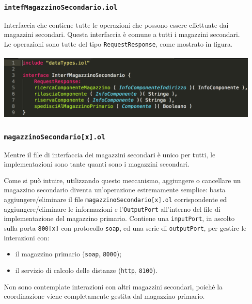 \subsubsection*{\tt intefMagazzinoSecondario.iol}
Interfaccia che contiene tutte le operazioni che possono essere
effettuate dai magazzini secondari. Questa interfaccia \`e comune a
tutti i magazzini secondari. Le operazioni sono tutte del tipo
{\tt RequestResponse}, come mostrato in figura. \\\\
\includegraphics[scale=0.5]{immagini/interfMagazzinoSecondario.png}

\subsubsection*{\tt magazzinoSecondario[x].ol}
Mentre il file di interfaccia dei magazzini secondari \`e unico per
tutti, le implementazioni sono tante quanti sono i magazzini secondari.

Come si pu\`o intuire, utilizzando questo meccanismo, aggiungere o
cancellare un magazzino secondario diventa un'operazione estremamente
semplice: basta aggiungere/eliminare il file
{\tt magazzinoSecondario[x].ol} corrispondente ed aggiungere/eliminare
le informazioni e l'{\tt OutputPort} all'interno del file di
implementazione del magazzino primario.
Contiene una {\tt inputPort}, in ascolto sulla porta {\tt 800[x]} con
protocollo {\tt soap}, ed una serie di {\tt outputPort}, per gestire le
interazioni con:
\begin{itemize}
  \item il magazzino primario ({\tt soap}, {\tt 8000});
  \item il servizio di calcolo delle distanze ({\tt http}, {\tt 8100}).
\end{itemize}
Non sono contemplate interazioni con altri magazzini secondari, poich\'e
la coordinazione viene completamente gestita dal magazzino primario.

